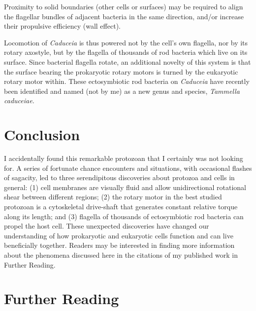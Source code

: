 \documentclass[authordate, editorial]{jote-new-article}
\begin{document}
	Proximity to solid boundaries (other cells or surfaces) may be required to align the flagellar bundles of adjacent bacteria in the same direction, and/or increase their propulsive efficiency (wall effect).







	Locomotion of \emph{Caduceia} is thus powered not by the cell's own flagella, nor by its rotary axostyle, but by the flagella of thousands of rod bacteria which live on its surface. Since bacterial flagella rotate, an additional novelty of this system is that the surface bearing the prokaryotic rotary motors is turned by the eukaryotic rotary motor within. These ectosymbiotic rod bacteria on \emph{Caduceia} have recently been identified and named (not by me) as a new genus and species, \emph{Tammella}\emph{ }\emph{caduceiae}\emph{. }







	\section{Conclusion}







	I accidentally found this remarkable protozoan that I certainly was not looking for. A series of fortunate chance encounters and situations, with occasional flashes of sagacity, led to three serendipitous discoveries about protozoa and cells in general: (1) cell membranes are visually fluid and allow unidirectional rotational shear between different regions; (2) the rotary motor in the best studied protozoan is a cytoskeletal drive-shaft that generates constant relative torque along its length; and (3) flagella of thousands of ectosymbiotic rod bacteria can propel the host cell. These unexpected discoveries have changed our understanding of how prokaryotic and eukaryotic cells function and can live beneficially together. Readers may be interested in finding more information about the phenomena discussed here in the citations of my published work in Further Reading.











	\section{Further Reading}
\end{document}
